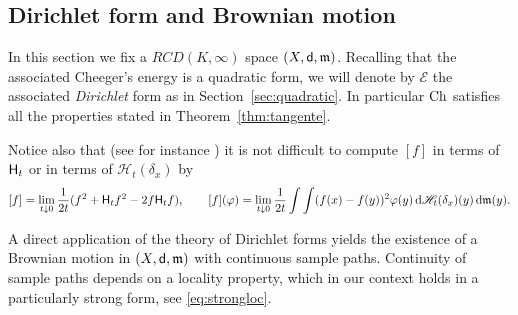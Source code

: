 \documentclass[reqno,11pt]{article}
\numberwithin{equation}{section}
\newcommand{\C}{\mathbb{C}}
\newcommand{\mm}{{\mbox{\boldmath$m$}}}
\newcommand{\sfd}{{\sf d}}
\renewcommand{\d}{{\mathrm d}}
\renewcommand{\C}{{\rm Ch}}
\newcommand{\rcd}[2]{RCD(#1,#2)}
\newcommand{\heatl}{{\sf H}}
\newcommand{\heatw}{{\mathscr H}}
\newcommand{\ke}[2]{\heatw_{#2}(\delta_{#1})}
\renewcommand{\mm}{\mathfrak m}
\begin{document}
\subsection{Dirichlet form and Brownian
motion}\label{sub8}

In this section we fix a $\rcd K\infty$ space $(X,\sfd,\mm)$.
Recalling that the associated Cheeger's energy is a quadratic form,
we will denote by $\mathcal E$ the associated \emph{Dirichlet} form
as in Section~\ref{sec:quadratic}. In particular $\C$ satisfies all
the properties stated in Theorem~\ref{thm:tangente}.

Notice also that (see for instance
\cite[Theorem~5.2.3]{Fukushima80}) it is not difficult to compute
$[f]$ in terms of $\heatl_t$ or in terms of $\ke xt$ by
\begin{equation}\label{eq:fuku3}
[f]=\lim_{t\downarrow
0}\frac{1}{2t}(f^2+\heatl_tf^2-2f\heatl_tf),\qquad
[f](\varphi)=\lim_{t\downarrow 0}\frac{1}{2t}\int\int
(f(x)-f(y))^2\varphi(y)\,\d\ke xt (y)\,\d\mm(y).
\end{equation}

A direct application of the theory of Dirichlet forms yields the
existence of a Brownian motion in $(X,\sfd,\mm)$ with continuous
sample paths. Continuity of sample paths depends on a locality
property, which in our context holds in a particularly strong form,
see \eqref{eq:strongloc}.
\end{document}

